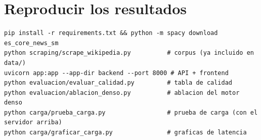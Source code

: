 \documentclass[11pt,letterpaper]{article}
\begin{document}
\section{Reproducir los resultados}

\begin{lstlisting}
pip install -r requirements.txt && python -m spacy download es_core_news_sm
python scraping/scrape_wikipedia.py          # corpus (ya incluido en data/)
uvicorn app:app --app-dir backend --port 8000 # API + frontend
python evaluacion/evaluar_calidad.py         # tabla de calidad
python evaluacion/ablacion_denso.py          # ablacion del motor denso
python carga/prueba_carga.py                 # prueba de carga (con el servidor arriba)
python carga/graficar_carga.py               # graficas de latencia
\end{lstlisting}
\end{document}
